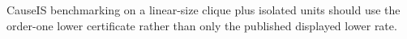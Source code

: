 CauseIS benchmarking on a linear-size clique plus isolated units should use the order-one lower certificate rather than only the published displayed lower rate.